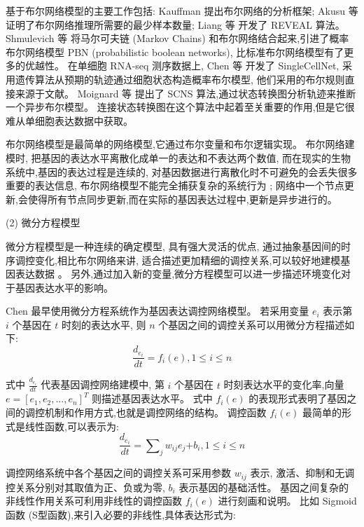 基于布尔网络模型的主要工作包括:
 Kauffman \cite{kauffman2003random} 提出布尔网络的分析框架;
Akusu 等 \cite{akutsu1999identification} 证明了布尔网络推理所需要的最少样本数量;
Liang 等 \cite{liang1998reveal} 开发了 REVEAL 算法。
Shmulevich 等 \cite{marshall2007inference} 将马尔可夫链 (Markov Chains) 和布尔网络结合起来,引进了概率布尔网络模型 PBN (probabilistic boolean networks),
比标准布尔网络模型有了更多的优越性。
在单细胞 RNA-seq 测序数据上,
Chen 等 \cite{chen2014single} 开发了 SingleCellNet,
采用遗传算法从预期的轨迹通过细胞状态构造概率布尔模型, 他们采用的布尔规则直接来源于文献。
Moignard 等 \cite{moignard2015decoding} 提出了 SCNS 算法,通过状态转换图分析轨迹来推断一个异步布尔模型。
连接状态转换图在这个算法中起着至关重要的作用,但是它很难从单细胞表达数据中获取。

布尔网络模型是最简单的网络模型,它通过布尔变量和布尔逻辑实现。
布尔网络建模时, 把基因的表达水平离散化成单一的表达和不表达两个数值,
而在现实的生物系统中,基因的表达过程是连续的,
对基因数据进行离散化时不可避免的会丢失很多重要的表达信息,
布尔网络模型不能完全捕获复杂的系统行为 \cite{lee2009computational};
网络中一个节点更新,会使得所有节点同步更新,而在实际的基因表达过程中,更新是异步进行的。

(2) 微分方程模型

微分方程模型是一种连续的确定模型, 具有强大灵活的优点,
通过抽象基因间的时序调控变化,相比布尔网络来讲, 适合描述更加精细的调控关系,可以较好地建模基因表达数据 \cite{gardner2003inferring,di2005chemogenomic,bansal2006inference, honkela2010model,lu2011high,li2011large}。
另外,通过加入新的变量,微分方程模型可以进一步描述环境变化对于基因表达水平的影响。

Chen \cite{chen1999modeling} 最早使用微分方程系统作为基因表达调控网络模型。
若采用变量 $e_i$ 表示第 $i$ 个基因在 $t$ 时刻的表达水平, 则 $n$ 个基因之间的调控关系可以用微分方程描述如下:
\begin{equation}
\frac{{d_{e_i}}}{{dt}} = f_i (e),1 \le i \le n
\end{equation}

式中 $\frac{{d_{e_i }}}{{dt}}$ 代表基因调控网络建模中,
第 $i$ 个基因在 $t$ 时刻表达水平的变化率,向量 $e=[e_1,e_2,...,e_n]^T$ 则描述基因表达水平。
式中 $f_i(e)$ 的表现形式表明了基因之间的调控机制和作用方式,也就是调控网络的结构。
调控函数 $f_i(e)$ 最简单的形式是线性函数,可以表示为:
\begin{equation}
\frac{{d_{e_i }}}{{dt}} = \sum\nolimits_j {w_{ij} e_j} { + b_i } ,1 \le i \le n
\end{equation}

调控网络系统中各个基因之间的调控关系可采用参数 $w_{ij}$ 表示,
激活、抑制和无调控关系分别对其取值为正、负或为零, $b_i$ 表示基因的基础活性。
基因之间复杂的非线性作用关系可利用非线性的调控函数 $f_i(e)$ 进行刻画和说明。
比如 Sigmoid 函数 (S型函数),来引入必要的非线性,具体表达形式为:

